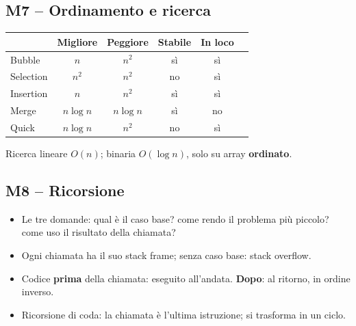 \subsection*{M7 -- Ordinamento e ricerca}
\begin{center}\small
\begin{tabular}{lccccc}
\toprule
 & \textbf{Migliore} & \textbf{Peggiore} & \textbf{Stabile} & \textbf{In loco} \\
\midrule
Bubble    & $n$        & $n^2$        & sì & sì \\
Selection & $n^2$      & $n^2$        & no & sì \\
Insertion & $n$        & $n^2$        & sì & sì \\
Merge     & $n\log n$  & $n\log n$    & sì & no \\
Quick     & $n\log n$  & $n^2$        & no & sì \\
\bottomrule
\end{tabular}
\end{center}
Ricerca lineare $O(n)$; binaria $O(\log n)$, solo su array \textbf{ordinato}.

\subsection*{M8 -- Ricorsione}
\begin{itemize}
  \item Le tre domande: qual è il caso base? come rendo il problema più piccolo? come uso
        il risultato della chiamata?
  \item Ogni chiamata ha il suo stack frame; senza caso base: stack overflow.
  \item Codice \textbf{prima} della chiamata: eseguito all'andata. \textbf{Dopo}: al
        ritorno, in ordine inverso.
  \item Ricorsione di coda: la chiamata è l'ultima istruzione; si trasforma in un ciclo.
\end{itemize}

